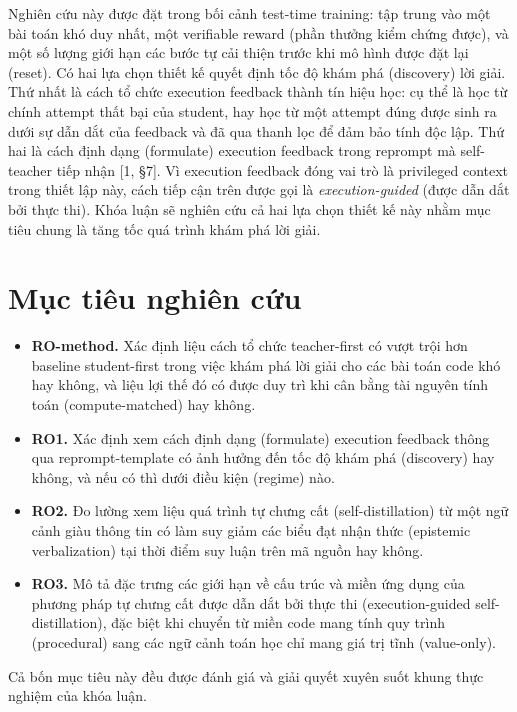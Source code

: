 Nghiên cứu này được đặt trong bối cảnh test-time training: tập trung vào một bài toán khó duy nhất, một verifiable reward (phần thưởng kiểm chứng được), và một số lượng giới hạn các bước tự cải thiện trước khi mô hình được đặt lại (reset). Có hai lựa chọn thiết kế quyết định tốc độ khám phá (discovery) lời giải. Thứ nhất là cách tổ chức execution feedback thành tín hiệu học: cụ thể là học từ chính attempt thất bại của student, hay học từ một attempt đúng được sinh ra dưới sự dẫn dắt của feedback và đã qua thanh lọc để đảm bảo tính độc lập. Thứ hai là cách định dạng (formulate) execution feedback trong reprompt mà self-teacher tiếp nhận {[}1, §7{]}. Vì execution feedback đóng vai trò là privileged context trong thiết lập này, cách tiếp cận trên được gọi là \emph{execution-guided} (được dẫn dắt bởi thực thi). Khóa luận sẽ nghiên cứu cả hai lựa chọn thiết kế này nhằm mục tiêu chung là tăng tốc quá trình khám phá lời giải.

\section{Mục tiêu nghiên cứu}\label{research-questions}

\begin{itemize}
\tightlist
\item
  \textbf{RO-method.} Xác định liệu cách tổ chức teacher-first có vượt trội hơn baseline student-first trong việc khám phá lời giải cho các bài toán code khó hay không, và liệu lợi thế đó có được duy trì khi cân bằng tài nguyên tính toán (compute-matched) hay không.
\item
  \textbf{RO1.} Xác định xem cách định dạng (formulate) execution feedback thông qua reprompt-template có ảnh hưởng đến tốc độ khám phá (discovery) hay không, và nếu có thì dưới điều kiện (regime) nào.
\item
  \textbf{RO2.} Đo lường xem liệu quá trình tự chưng cất (self-distillation) từ một ngữ cảnh giàu thông tin có làm suy giảm các biểu đạt nhận thức (epistemic verbalization) tại thời điểm suy luận trên mã nguồn hay không.
\item
  \textbf{RO3.} Mô tả đặc trưng các giới hạn về cấu trúc và miền ứng dụng của phương pháp tự chưng cất được dẫn dắt bởi thực thi (execution-guided self-distillation), đặc biệt khi chuyển từ miền code mang tính quy trình (procedural) sang các ngữ cảnh toán học chỉ mang giá trị tĩnh (value-only).
\end{itemize}

Cả bốn mục tiêu này đều được đánh giá và giải quyết xuyên suốt khung thực nghiệm của khóa luận.

